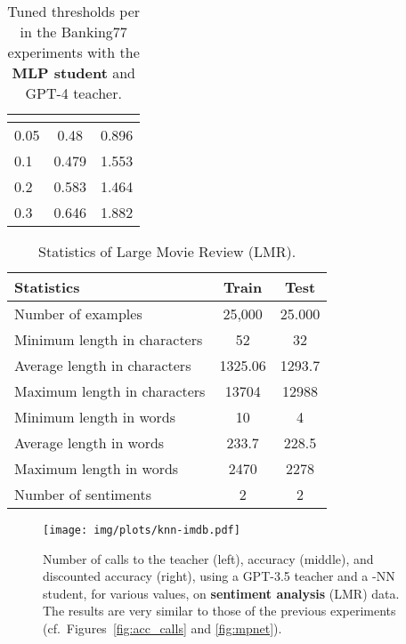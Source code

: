 \documentclass[11pt]{article}
\begin{document}
\begin{table}[!h]
\centering
\small
    \begin{tabular}{|l|c|c|}
    \hline
    \textbf{} & \textbf{} &  \\
    \hline
        0.05 & 0.48 & 0.896\\
        0.1 & 0.479 & 1.553 \\
        0.2 & 0.583 & 1.464 \\
        0.3 & 0.646 & 1.882 \\
    \hline
    \end{tabular}
    \vspace{-1mm}
\caption{Tuned thresholds per  in the Banking77 experiments with the \textbf{MLP student} and GPT-4 teacher.}
\label{tab:threshold_pel_l_mlp}
\vspace{-1em}
\end{table}


\begin{table}[tb]
\centering
\small

    \begin{tabular}{|l|c|c|}
    \hline
    \textbf{Statistics} & \textbf{Train} & \textbf{Test} \\
    \hline
        Number of examples & 25,000 & 25.000 \\
        \hline
        Minimum length in characters & 52 & 32 \\
        Average length in characters & 1325.06 & 1293.7 \\
        Maximum length in characters & 13704 & 12988 \\
        \hline
        Minimum length in words & 10 & 4 \\
        Average length in words & 233.7 & 228.5 \\
        Maximum length in words & 2470 & 2278 \\
        \hline
        Number of sentiments & 2 & 2 \\
    \hline
    \end{tabular}
    \vspace{-1mm}
\caption{Statistics of Large Movie Review (LMR).}
\label{tab:lmr-stats}
\vspace{-1em}
\end{table}

\begin{figure*}[!t]
\centering
{
    \texttt{[image: img/plots/knn-imdb.pdf]}
    \vspace{-4mm}
    \caption{
    Number of calls to the teacher (left),  accuracy (middle), and discounted accuracy (right), using a GPT-3.5 teacher and a -NN student, for various  values, on \textbf{sentiment analysis} (LMR) data. The results are very similar to those of the previous experiments (cf.\ Figures~\ref{fig:acc_calls} and \ref{fig:mpnet}).}
    \label{fig:knn-imdb}
}
\end{figure*}
\end{document}
